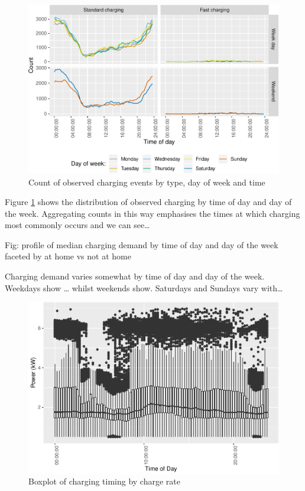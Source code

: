 \documentclass[]{article}
\begin{document}
\begin{figure}
\centering
\includegraphics{EVBB_report_files/figure-latex/chargeTime-1.pdf}
\caption{\label{fig:chargeTime}Count of observed charging events by type,
day of week and time}
\end{figure}

Figure \ref{fig:chargeTime} shows the distribution of observed charging
by time of day and day of the week. Aggregating counts in this way
emphasises the times at which charging most commonly occurs and we can
see\ldots{}

Fig: profile of median charging demand by time of day and day of the
week faceted by at home vs not at home

Charging demand varies somewhat by time of day and day of the week.
Weekdays show \ldots{} whilst weekends show. Saturdays and Sundays vary
with\ldots{}

\begin{figure}
\centering
\includegraphics{EVBB_report_files/figure-latex/boxplotCharging-1.pdf}
\caption{\label{fig:boxplotCharging}Boxplot of charging timing by charge
rate}
\end{figure}
\end{document}
